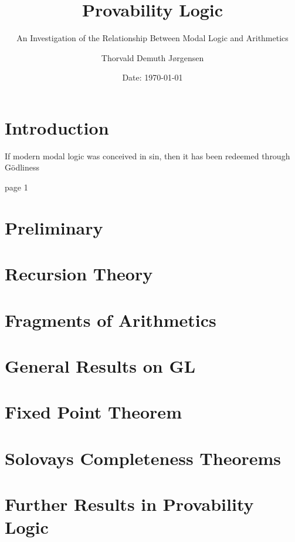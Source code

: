 \documentclass[12pt,a4paper,dvipsnames,bibliography=totocnumbered]{scrbook}
\author{Thorvald Demuth Jørgensen}
\title{Provability Logic}
\subtitle{An Investigation of the Relationship Between Modal Logic and
Arithmetics}
\date{Date: {\today}}
\theoremstyle{dotlessS}
\theoremstyle{dotlessS}
\theoremstyle{dotlessS}
\theoremstyle{dotlessS}
\theoremstyle{dotlessS}
\theoremstyle{dotlessS}
\theoremstyle{dotlessS}
\newcommand{\0}{\overline{0}}
\newcommand{\1}{\raisebox{\dimexpr1.79ex- \height}{$1$}}
\begin{document}
\maketitle
\tableofcontents
\newpage


\chapter{Introduction}
\epigraph{If modern modal logic was conceived in sin, then it has been redeemed
through Gödliness}{\cite{Boolos1979} page 1}
\label{chap:intro}


\chapter{Preliminary}
\label{chap:Pre}


\chapter{Recursion Theory}
\label{chap:Recur}


\chapter{Fragments of Arithmetics}
\label{chap:PRA}


\chapter{General Results on GL}
\label{chap:GL}


\chapter{Fixed Point Theorem}
\label{chap:Fixed}


\chapter{Solovays Completeness Theorems}
\label{chap:Complete}


\chapter{Further Results in Provability Logic}
\label{chap:Further}

\nocite{*}
\printbibliography
\end{document}
